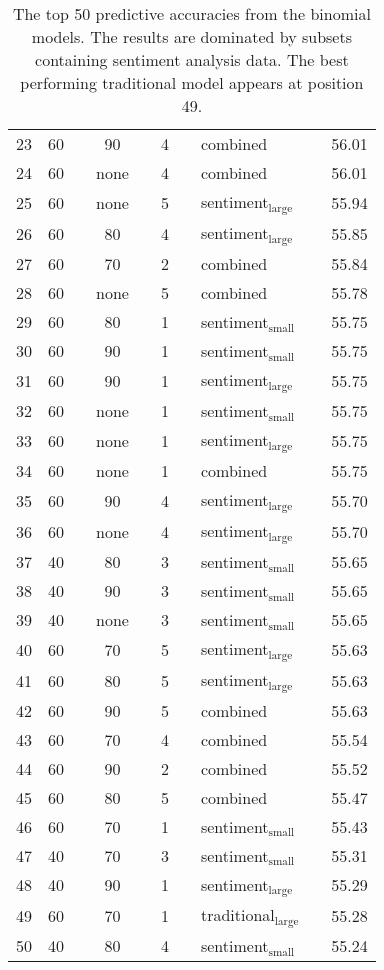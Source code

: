 \documentclass{article}
\begin{document}
\begin{table}
\begin{tabular}{cclclclllc}
23 & 60 &  & 90 &  & 4 &  & combined &  & 56.01\\
24 & 60 &  & none &  & 4 &  & combined &  & 56.01\\
25 & 60 &  & none &  & 5 &  & sentiment$_{\text{large}}$ &  & 55.94\\
26 & 60 &  & 80 &  & 4 &  & sentiment$_{\text{large}}$ &  & 55.85\\
27 & 60 &  & 70 &  & 2 &  & combined &  & 55.84\\
28 & 60 &  & none &  & 5 &  & combined &  & 55.78\\
29 & 60 &  & 80 &  & 1 &  & sentiment$_{\text{small}}$ &  & 55.75\\
30 & 60 &  & 90 &  & 1 &  & sentiment$_{\text{small}}$ &  & 55.75\\
31 & 60 &  & 90 &  & 1 &  & sentiment$_{\text{large}}$ &  & 55.75\\
32 & 60 &  & none &  & 1 &  & sentiment$_{\text{small}}$ &  & 55.75\\
33 & 60 &  & none &  & 1 &  & sentiment$_{\text{large}}$ &  & 55.75\\
34 & 60 &  & none &  & 1 &  & combined &  & 55.75\\
35 & 60 &  & 90 &  & 4 &  & sentiment$_{\text{large}}$ &  & 55.70\\
36 & 60 &  & none &  & 4 &  & sentiment$_{\text{large}}$ &  & 55.70\\
37 & 40 &  & 80 &  & 3 &  & sentiment$_{\text{small}}$ &  & 55.65\\
38 & 40 &  & 90 &  & 3 &  & sentiment$_{\text{small}}$ &  & 55.65\\
39 & 40 &  & none &  & 3 &  & sentiment$_{\text{small}}$ &  & 55.65\\
40 & 60 &  & 70 &  & 5 &  & sentiment$_{\text{large}}$ &  & 55.63\\
41 & 60 &  & 80 &  & 5 &  & sentiment$_{\text{large}}$ &  & 55.63\\
42 & 60 &  & 90 &  & 5 &  & combined &  & 55.63\\
43 & 60 &  & 70 &  & 4 &  & combined &  & 55.54\\
44 & 60 &  & 90 &  & 2 &  & combined &  & 55.52\\
45 & 60 &  & 80 &  & 5 &  & combined &  & 55.47\\
46 & 60 &  & 70 &  & 1 &  & sentiment$_{\text{small}}$ &  & 55.43\\
47 & 40 &  & 70 &  & 3 &  & sentiment$_{\text{small}}$ &  & 55.31\\
48 & 40 &  & 90 &  & 1 &  & sentiment$_{\text{large}}$ &  & 55.29\\
49 & 60 &  & 70 &  & 1 &  & traditional$_{\text{large}}$ &  & 55.28\\
50 & 40 &  & 80 &  & 4 &  & sentiment$_{\text{small}}$ &  & 55.24\\
\end{tabular}\caption[The top 50 binomial models, ranked by descending predictive accuracy]{\label{tab:top-bin-results}The top 50 predictive accuracies from the binomial models. The results are dominated by subsets containing sentiment analysis data. The best performing traditional model appears at position 49.}


\end{table}
\end{document}
